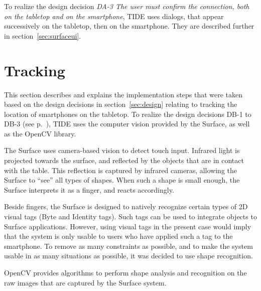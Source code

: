 To realize the design decision
\emph{DA-3 The user must confirm the connection, both on the tabletop and on the smartphone},
TIDE uses dialogs, that appear successively on the tabletop, then on the smartphone.
They are described further in section~\ref{sec:surfaceui}.

\section{Tracking}
\label{sec:tracking}

This section describes and explains the implementation steps that were taken based on the design decisions in section~\ref{sec:design} relating to tracking the location of smartphones on the tabletop.
To realize the design decisions DB-1 to DB-3 (see p.~\pageref{DB}), TIDE uses the computer vision provided by the Surface, as well as the OpenCV library.

The Surface uses camera-based vision to detect touch input.
Infrared light is projected towards the surface, and reflected by the objects that are in contact with the table.
This reflection is captured by infrared cameras, allowing the Surface to ``see'' all types of shapes.
When such a shape is small enough, the Surface interprets it as a finger, and reacts accordingly.

Beside fingers, the Surface is designed to natively recognize certain types of 2D visual tags (Byte and Identity tags).
Such tags can be used to integrate objects to Surface applications.
However, using visual tags in the present case would imply that the system is only usable to users who have applied such a tag to the smartphone.
To remove as many constraints as possible, and to make the system usable in as many situations as possible, it was decided to use shape recognition.

OpenCV provides algorithms to perform shape analysis and recognition on the raw images that are captured by the Surface system. 


